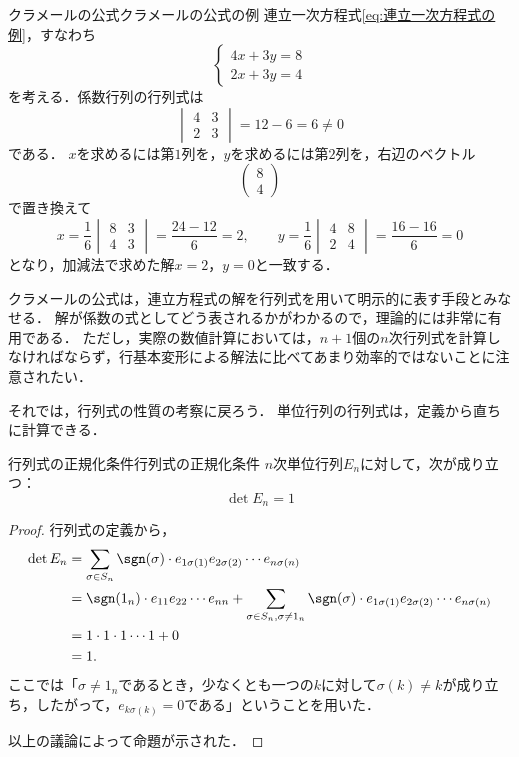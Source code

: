 \begin{example}{クラメールの公式}{クラメールの公式の例}
  連立一次方程式\eqref{eq:連立一次方程式の例}，すなわち
  \[
    \begin{cases} 4x + 3y = 8 \\ 2x + 3y = 4 \end{cases}
  \]
  を考える．係数行列の行列式は
  \[
    \begin{vmatrix} 4 & 3 \\ 2 & 3 \end{vmatrix} = 12 - 6 = 6 \ne 0
  \]
  である．
  $x$を求めるには第$1$列を，$y$を求めるには第$2$列を，右辺のベクトル
  \[
    \begin{pmatrix} 8 \\ 4 \end{pmatrix}
  \]
  で置き換えて
  \[
    x = \frac{1}{6}\begin{vmatrix} 8 & 3 \\ 4 & 3 \end{vmatrix} = \frac{24 - 12}{6} = 2, \qquad
    y = \frac{1}{6}\begin{vmatrix} 4 & 8 \\ 2 & 4 \end{vmatrix} = \frac{16 - 16}{6} = 0
  \]
  となり，加減法で求めた解$x = 2$，$y = 0$と一致する．
\end{example}

クラメールの公式は，連立方程式の解を行列式を用いて明示的に表す手段とみなせる．
解が係数の式としてどう表されるかがわかるので，理論的には非常に有用である．
ただし，実際の数値計算においては，$n+1$個の$n$次行列式を計算しなければならず，行基本変形による解法に比べてあまり効率的ではないことに注意されたい．

それでは，行列式の性質の考察に戻ろう．
単位行列の行列式は，定義から直ちに計算できる．

\begin{prop}{行列式の正規化条件}{行列式の正規化条件}
  $n$次単位行列$E_n$に対して，次が成り立つ：
  \[
  \det E_n = 1
  \]
\end{prop}

\begin{tleftbar}
\begin{proof}
  行列式の定義から，
  \begin{align*} 
    \det E_n &= \sum_{\sigma \in S_n} \sgn(\sigma) \cdot e_{1\sigma(1)} e_{2\sigma(2)} \dotsm e_{n\sigma(n)} \\
    &= \sgn(1_n) \cdot e_{11} e_{22} \dotsm e_{nn} + \sum_{\sigma \in S_n, \sigma \ne 1_n} \sgn(\sigma) \cdot e_{1\sigma(1)} e_{2\sigma(2)} \dotsm e_{n\sigma(n)} \\
    &= 1 \cdot 1 \cdot 1 \dotsm 1 + 0 \\
    &= 1.
  \end{align*}
  ここでは「$\sigma \ne 1_n$であるとき，少なくとも一つの$k$に対して$\sigma(k) \ne k$が成り立ち，したがって，$e_{k\sigma(k)} = 0$である」ということを用いた．

  以上の議論によって命題が示された．
\end{proof}
\end{tleftbar}

